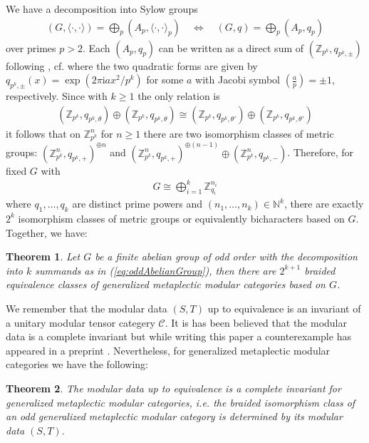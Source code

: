 \documentclass[twoside,11pt,reqno]{amsart}
\makeatletter
\newtheorem{thm}{Theorem}[section]
\theoremstyle{definition}
\theoremstyle{remark}
\newcommand{\cC}{\mathcal{C}}
\newcommand{\ZZ}{\mathbb{Z}}
\newcommand{\NN}{\mathbb{N}}
\newcommand{\ima}{\mathrm{i}}
\DeclareRobustCommand{\cf}{cf.\@\xspace}
\DeclareRobustCommand{\ie}{i.e.\@\xspace}
\newcommand{\bi}[2]{\langle #1,#2\rangle}
\newcommand{\bislotslot}{\bi\cdot\cdot}
\makeatother
\begin{document}
We have a decomposition into Sylow groups 
\begin{align}
  (G,\bislotslot) =\bigoplus_p (A_p,{\bislotslot}_p) 
   \quad\Longleftrightarrow \quad
  (G,q) =\bigoplus_p (A_p,q_p)
\end{align}
over primes $p>2$.
Each $(A_p,q_p)$ 
can be written as a direct sum of $(\ZZ_{p^k},q_{p^k,\pm})$ following 
\cite[Theorem 2.1]{BaJo2015}, \cf \cite{Wa1963,Ni1979}
where the two quadratic forms are given by $q_{p^k,\pm}(x) = \exp(2\pi \ima a x^2/p^k)$ for some $a$ with Jacobi symbol 
$( \frac ap )=\pm 1$, respectively.
Since with $k\geq 1$ the only relation \cite[Proposition 1.8.1 and 1.8.2]{Ni1979} is  
\begin{align}
  (\ZZ_{p^k},q_{p^k,\theta})\oplus
  (\ZZ_{p^k},q_{p^k,\theta})
  \cong (\ZZ_{p^k},q_{p^k,\theta'})\oplus
  (\ZZ_{p^k},q_{p^k,\theta'})
\end{align}
it follows that on  $\ZZ_{p^k}^n$ for $n\geq 1$ there are two isomorphism classes of metric groups:
$(\ZZ_{p^k}^n,q_{p^k,+})^{\oplus n}$ and $(\ZZ_{p^k}^n,q_{p^k,+})^{\oplus (n-1)}\oplus(\ZZ_{p^k}^n,q_{p^k,-})$.
Therefore, for fixed $G$ with 
\begin{align}
  G\cong \bigoplus_{i=1}^k \ZZ^{n_i}_{q_i} 
  \label{eq:oddAbelianGroup}
\end{align}
where $q_1,\ldots,q_k$ are distinct prime powers and 
$(n_1,\ldots,n_k)\in \NN^k$, 
there are exactly $2^k$ isomorphism classes of metric groups or equivalently 
bicharacters %
based on $G$.
Together, we have:
\begin{thm}
  \label{thm:MPclass2}
  Let $G$ be a finite abelian group of odd order with the decomposition into 
  $k$ summands as in (\ref{eq:oddAbelianGroup}), then there are $2^{k+1}$ 
  braided equivalence classes of generalized metaplectic modular categories 
  based on $G$.
\end{thm}
We remember that the modular data $(S,T)$ up to equivalence is an invariant
of a unitary modular tensor categery $\cC$.
It is has been believed that the modular data is a complete invariant %
but while writing this paper a counterexample has appeared in a preprint 
\cite{MiSc2017pp}.
Nevertheless, for generalized metaplectic modular categories we have the 
following:
\begin{thm}
  \label{thm:MPST}
  The modular data up to equivalence is a complete invariant for 
  generalized metaplectic modular categories, \ie 
  the braided isomorphism class of an odd generalized metaplectic modular 
  category is determined by its modular data $(S,T)$.
\end{thm}
\end{document}

